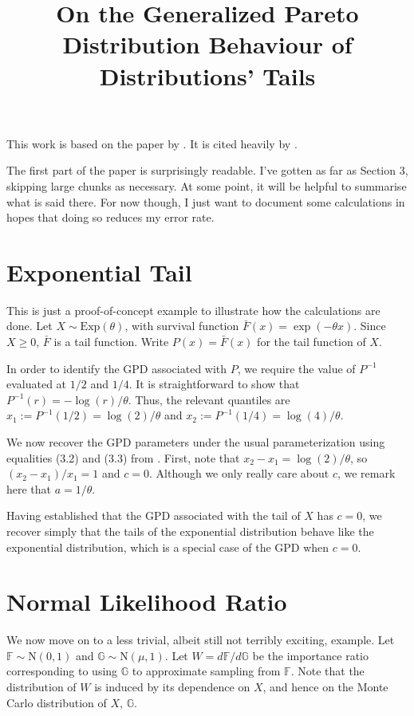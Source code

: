 \documentclass{article}
\title{On the Generalized Pareto Distribution Behaviour of Distributions' Tails}
\newcommand{\bG}{\mathbb{G}}
\newcommand{\bF}{\mathbb{F}}
\begin{document}
\maketitle

This work is based on the paper by \citet{Pic75}. It is cited heavily by \citet{Veh22}.

The first part of the paper is surprisingly readable. I've gotten as far as Section 3, skipping large chunks as necessary. At some point, it will be helpful to summarise what is said there. For now though, I just want to document some calculations in hopes that doing so reduces my error rate.

\section{Exponential Tail}

This is just a proof-of-concept example to illustrate how the calculations are done. Let $X \sim \mathrm{Exp}(\theta)$, with survival function $\bar{F}(x) = \exp(-\theta x)$. Since $X \geq 0$, $\bar{F}$ is a tail function. Write $P(x) = \bar{F}(x)$ for the tail function of $X$.

In order to identify the GPD associated with $P$, we require the value of $P^{-1}$ evaluated at $1/2$ and $1/4$. It is straightforward to show that $P^{-1}(r) = - \log(r)/\theta$. Thus, the relevant quantiles are $x_1 := P^{-1}(1/2) = \log(2)/\theta$ and $x_2 := P^{-1}(1/4) = \log(4)/\theta$.

We now recover the GPD parameters under the usual parameterization using equalities (3.2) and (3.3) from \citet{Pic75}. First, note that $x_2 - x_1 = \log(2)/\theta$, so $(x_2 - x_1)/x_1 = 1$ and $c=0$. Although we only really care about $c$, we remark here that $a = 1/\theta$.

Having established that the GPD associated with the tail of $X$ has $c=0$, we recover simply that the tails of the exponential distribution behave like the exponential distribution, which is a special case of the GPD when $c=0$.

\section{Normal Likelihood Ratio}

We now move on to a less trivial, albeit still not terribly exciting, example. Let $\bF \sim \mathrm{N}(0,1)$ and $\bG \sim \mathrm{N}(\mu, 1)$. Let $W = d \bF / d \bG$ be the importance ratio corresponding to using $\bG$ to approximate sampling from $\bF$. Note that the distribution of $W$ is induced by its dependence on $X$, and hence on the Monte Carlo distribution of $X$, $\bG$.
\end{document}
